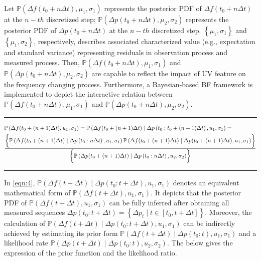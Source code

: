 \documentclass[lettersize,journal]{IEEEtran}
\begin{document}
Let $\mathbb{P}\left(\Delta f(t_0 +n\Delta t), \mu_{1}, \sigma_{1}\right)$ represents the posterior PDF of $\Delta f(t_0 +n \Delta t)$ at the $n-th$ discretized step; $\mathbb{P}\left(\Delta p(t_0 +n \Delta t), \mu_{2}, \sigma_{2}\right)$ represents the posterior PDF of $\Delta p(t_0 +n \Delta t)$ at the $n-th$ discretized step. $\left\{\mu_{1}, \sigma_{1}\right\}$ and $\left\{\mu_{1}, \sigma_{2}\right\}$, respectively, describes associated characterized value (e.g., expectation and standard variance) representing residuals in observation process and measured process. Then, $\mathbb{P}\left(\Delta f(t_0 +n \Delta t), \mu_{1}, \sigma_{1}\right)$ and $\mathbb{P}\left(\Delta p(t_0 +n \Delta t), \mu_{2}, \sigma_{2}\right)$ are capable to reflect the impact of UV feature on the frequency changing process. Furthermore, a Bayesian-based BF framework is implemented to depict the interactive relation between $\mathbb{P}\left(\Delta f(t_0 + n\Delta t), \mu_{1}, \sigma_{1}\right)$ and $\mathbb{P}\left(\Delta p(t_0 +n \Delta t), \mu_{2}, \sigma_{2}\right)$.

\begin{strip}
\rule{0.5\textwidth}{.4pt}
\begin{align}\label{eqn:4}
& \mathbb{P}\left(\Delta f(t_0+ (n+1)\Delta t), u_{1}, \sigma_{1}\right)=\mathbb{P}\left(\Delta f(t_0+ (n+ 1)\Delta t) \mid \Delta p\left(t_{0}: t_0+ (n+ 1)\Delta t\right), u_{1}, \sigma_{1}\right) =\\
& \frac{\biggl\{\mathbb{P}\left(\Delta f(t_0+ (n+ 1)\Delta t) \mid \Delta p\left(t_{0}: n \Delta t\right), u_{1}, \sigma_{1}\right) \mathbb{P}\left(\Delta f(t_0+ (n+1)\Delta t) \mid \Delta p(t_0+(n+ 1)\Delta t), u_{1}, \sigma_{1}\right)\biggr\}}{\biggl\{\mathbb{P}\left(\Delta p(t_0+(n+1)\Delta t) \mid \Delta p\left(t_{0}: n \Delta t\right), u_{2}, \sigma_{2}\right)\biggr\}}\notag
\end{align}
\hspace{0.5\textwidth}\rule{0.5\textwidth}{.4pt}
\end{strip}

In \eqref{eqn:4}, $\mathbb{P}\left(\Delta f(t+\Delta t) \mid \Delta p\left(t_{0}: t+\Delta t\right), u_{1}, \sigma_{1}\right)$ denotes an equivalent mathematical form of $\mathbb{P}\left(\Delta f(t+\Delta t), u_{1}, \sigma_{1}\right)$. It depicts that the posterior PDF of $\mathbb{P}\left(\Delta f(t+\Delta t), u_{1}, \sigma_{1}\right)$ can be fully inferred after obtaining all measured sequences $\Delta p\left(t_{0}: t+\Delta t\right)=\left\{\Delta p_{t} \mid t \in\left[t_{0}, t+\Delta t\right]\right\}$. Moreover, the calculation of $\mathbb{P}\left(\Delta f(t+\Delta t) \mid \Delta p\left(t_{0}: t+\Delta t\right), u_{1}, \sigma_{1}\right)$ can be indirectly achieved by estimating its prior form $\mathbb{P}\left(\Delta f(t+\Delta t) \mid \Delta p\left(t_{0}: t\right), u_{1}, \sigma_{1}\right)$ and a likelihood rate $\mathbb{P}\left(\Delta p(t+\Delta t) \mid \Delta p\left(t_{0}: t\right), u_{2}, \sigma_{2}\right)$. The below gives the expression of the prior function and the likelihood ratio.
\end{document}
